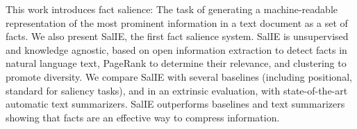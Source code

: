 This work introduces fact salience: The task of generating a machine-readable representation of the most prominent information in a text document as a set of facts. We also present SalIE, the first fact salience system. SalIE is unsupervised and knowledge agnostic, based on open information extraction to detect facts in natural language text, PageRank to determine their relevance, and clustering to promote diversity. We compare SalIE with several baselines (including positional, standard for saliency tasks), and in an extrinsic evaluation, with state-of-the-art automatic text summarizers. SalIE outperforms baselines and text summarizers showing that facts are an effective way to compress information.
